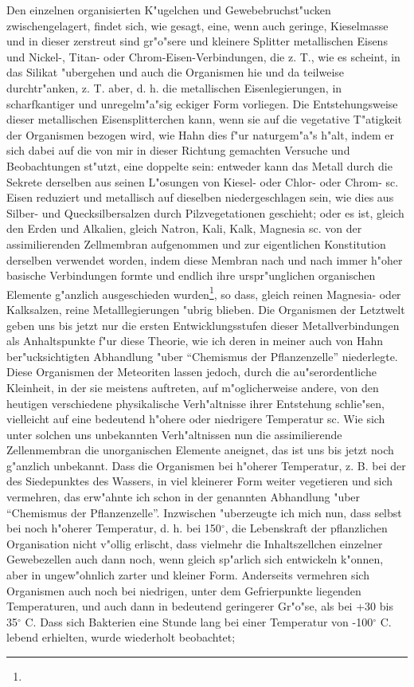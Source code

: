 \documentclass[a4paper, 11pt, oneside]{article}
\begin{document}
Den einzelnen organisierten K"ugelchen und Gewebebruchst"ucken zwischengelagert, findet sich, wie gesagt, eine, wenn auch geringe, Kieselmasse und in dieser zerstreut sind gr"o"sere und kleinere Splitter metallischen Eisens und Nickel-, Titan- oder Chrom-Eisen-Verbindungen, die z. T., wie es scheint, in das Silikat "ubergehen und auch die Organismen hie und da teilweise durchtr"anken, z. T. aber, d. h. die metallischen Eisenlegierungen, in scharfkantiger und unregelm"a"sig eckiger Form vorliegen. Die Entstehungsweise dieser metallischen Eisensplitterchen kann, wenn sie auf die vegetative T"atigkeit der Organismen bezogen wird, wie Hahn dies f"ur naturgem"a"s h"alt, indem er sich dabei auf die von mir in dieser Richtung gemachten Versuche und Beobachtungen st"utzt, eine doppelte sein: entweder kann das Metall durch die Sekrete derselben aus seinen L"osungen von Kiesel- oder Chlor- oder Chrom- sc. Eisen reduziert und metallisch auf dieselben niedergeschlagen sein, wie dies aus Silber- und Quecksilbersalzen durch Pilzvegetationen geschieht; oder es ist, gleich den Erden und Alkalien, gleich Natron, Kali, Kalk, Magnesia sc. von der assimilierenden Zellmembran aufgenommen und zur eigentlichen Konstitution derselben verwendet worden, indem diese Membran nach und nach immer h"oher basische Verbindungen formte und endlich ihre urspr"unglichen organischen Elemente g"anzlich ausgeschieden wurden\footnote{}, so dass, gleich reinen Magnesia- oder Kalksalzen, reine Metalllegierungen "ubrig blieben. Die Organismen der Letztwelt geben uns bis jetzt nur die ersten Entwicklungsstufen dieser Metallverbindungen als Anhaltspunkte f"ur diese Theorie, wie ich deren in meiner auch von Hahn ber"ucksichtigten Abhandlung "uber "`Chemismus der Pflanzenzelle"' niederlegte. Diese Organismen der Meteoriten lassen jedoch, durch die au"serordentliche Kleinheit, in der sie meistens auftreten, auf m"oglicherweise andere, von den heutigen verschiedene physikalische Verh"altnisse ihrer Entstehung schlie"sen, vielleicht auf eine bedeutend h"ohere oder niedrigere Temperatur sc. Wie sich unter solchen uns unbekannten Verh"altnissen nun die assimilierende Zellenmembran die unorganischen Elemente aneignet, das ist uns bis jetzt noch g"anzlich unbekannt. Dass die Organismen bei h"oherer Temperatur, z. B. bei der des Siedepunktes des Wassers, in viel kleinerer Form weiter vegetieren und sich vermehren, das erw"ahnte ich schon in der genannten Abhandlung "uber "`Chemismus der Pflanzenzelle"'. Inzwischen "uberzeugte ich mich nun, dass selbst bei noch h"oherer Temperatur, d. h. bei 150$^{\circ}$, die Lebenskraft der pflanzlichen Organisation nicht v"ollig erlischt, dass vielmehr die Inhaltszellchen einzelner Gewebezellen auch dann noch, wenn gleich sp"arlich sich entwickeln k"onnen, aber in ungew"ohnlich zarter und kleiner Form. Anderseits vermehren sich Organismen auch noch bei niedrigen, unter dem Gefrierpunkte liegenden Temperaturen, und auch dann in bedeutend geringerer Gr"o"se, als bei +30 bis 35$^{\circ}$ C. Dass sich Bakterien eine Stunde lang bei einer Temperatur von -100$^{\circ}$ C. lebend erhielten, wurde wiederholt beobachtet; 
\end{document}
